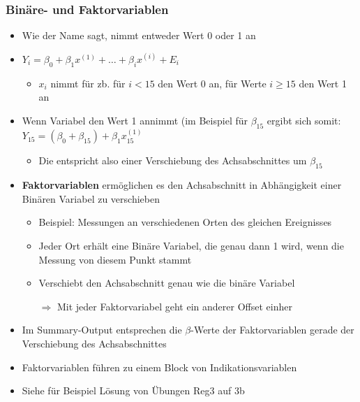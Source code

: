 \subsubsection{Binäre- und Faktorvariablen}
\begin{itemize}
	\item Wie der Name sagt, nimmt entweder Wert 0 oder 1 an
	\item $Y_i =\beta_0+\beta_1x^{(1)}+\ldots+\beta_ix^{(i)}+E_i$
	\begin{itemize}
		\item $x_i$ nimmt für zb. für $i<15$ den Wert 0 an, für Werte $i\geq15$ den Wert 1 an 
	\end{itemize}
	\item Wenn Variabel den Wert 1 annimmt (im Beispiel für $\beta_{15}$ ergibt sich somit: $Y_{15}=\left(\beta_0+\beta_{15}\right)+\beta_1x_{15}^{(1)}$
	\begin{itemize}
		\item Die entspricht also einer Verschiebung des Achsabschnittes um $\beta_{15}$
	\end{itemize}
	\item \textbf{Faktorvariablen} ermöglichen es den Achsabschnitt in Abhängigkeit einer Binären Variabel zu verschieben
	\begin{itemize}
		\item Beispiel: Messungen an verschiedenen Orten des gleichen Ereignisses
		\item Jeder Ort erhält eine Binäre Variabel, die genau dann 1 wird, wenn die Messung von diesem Punkt stammt
		\item Verschiebt den Achsabschnitt genau wie die binäre Variabel 
		\item [$\Rightarrow$] Mit jeder Faktorvariabel geht ein anderer Offset einher
	\end{itemize}
	\item Im Summary-Output entsprechen die $\beta$-Werte der Faktorvariablen gerade der Verschiebung des Achsabschnittes
	\item Faktorvariablen führen zu einem Block von Indikationsvariablen
	\item Siehe für Beispiel Lösung von Übungen Reg3 auf 3b
\end{itemize}

